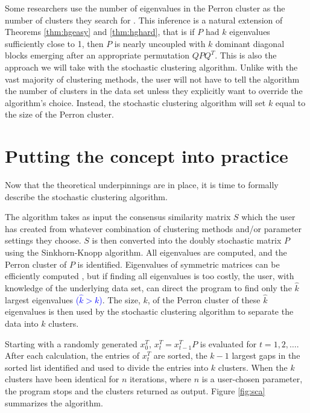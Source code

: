\documentclass[final]{siamltex}
\begin{document}
Some researchers use the number of eigenvalues in the Perron cluster as the number of clusters they search for \cite{deuflhard2000iai, fritzsche2008sai}. This inference is a natural extension of Theorems \ref{thm:hgeasy} and \ref{thm:hghard}, that is if $P$ had $k$ eigenvalues sufficiently close to 1, then $P$ is nearly uncoupled with $k$ dominant diagonal blocks emerging after an appropriate permutation $QPQ^{T}$. This is also the approach we will take with the stochastic clustering algorithm. Unlike with the vast majority of clustering methods, the user will not have to tell the algorithm the number of clusters in the data set unless they explicitly want to override the algorithm's choice. Instead, the stochastic clustering algorithm will set $k$ equal to the size of the Perron cluster.

\section{Putting the concept into practice} \label{sec:cip}

Now that the theoretical underpinnings are in place, it is time to formally describe the stochastic clustering algorithm. 

The algorithm takes as input the consensus similarity matrix $S$ which the user has created from whatever combination of clustering methods and/or parameter settings they choose. $S$ is then converted into the doubly stochastic matrix $P$ using the Sinkhorn-Knopp algorithm.  All eigenvalues are computed, and the Perron cluster of $P$ is identified. Eigenvalues of symmetric matrices can be efficiently computed  \cite{parlett1998sep}, but if finding all eigenvalues is too costly, the user, with knowledge of the underlying data set, can direct the program to find only the $\hat{k}$ largest eigenvalues \textcolor{blue}{($\hat{k}>k$)}. The size, $k$, of the Perron cluster of these $\hat{k}$ eigenvalues is then used by the stochastic clustering algorithm to separate the data into $k$ clusters.

Starting with a randomly generated $x_{0}^{T}$, $x_{t}^{T}=x_{t-1}^{T}P$ is evaluated for $t=1,2,\dots$. After each calculation, the entries of $x_{t}^{T}$ are sorted, the $k-1$ largest gaps in the sorted list identified and used to divide the entries into $k$ clusters.  When the $k$ clusters have been identical for $n$ iterations, where $n$ is a user-chosen parameter, the program stops and the clusters returned as output. Figure \ref{fig:sca} summarizes the algorithm.
\end{document}
